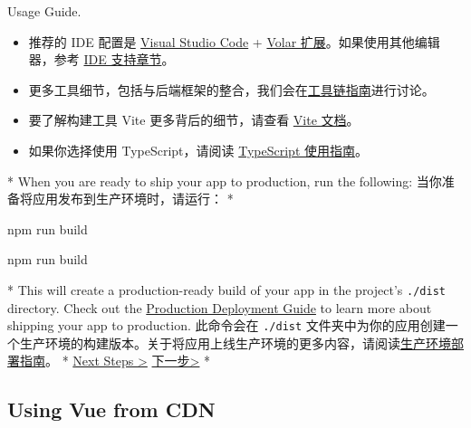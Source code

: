 \begin{paracol}{2}
\begin{itemize}
{      Usage Guide}.
    \end{itemize}
\switchcolumn
\begin{itemize}
    \item
      推荐的 IDE 配置是 \href{https://code.visualstudio.com/}{Visual Studio
      Code} +
      \href{https://marketplace.visualstudio.com/items?itemName=Vue.volar}{Volar
      扩展}。如果使用其他编辑器，参考
      \href{https://cn.vuejs.org/guide/scaling-up/tooling.html\#ide-support}{IDE
      支持章节}。
    \item
      更多工具细节，包括与后端框架的整合，我们会在\href{https://cn.vuejs.org/guide/scaling-up/tooling.html}{工具链指南}进行讨论。
    \item
      要了解构建工具 Vite 更多背后的细节，请查看
      \href{https://cn.vitejs.dev/}{Vite 文档}。
    \item
      如果你选择使用 TypeScript，请阅读
      \href{https://cn.vuejs.org/guide/typescript/overview.html}{TypeScript
      使用指南}。
    \end{itemize}
\switchcolumn[0]*%
When you are ready to ship your app to production, run the following:
\switchcolumn
当你准备将应用发布到生产环境时，请运行：
\switchcolumn[0]*%
\begin{codeShellMul}
npm run build
\end{codeShellMul}
\switchcolumn
\begin{codeShellMul}
npm run build
\end{codeShellMul}
\switchcolumn[0]*%
This will create a production-ready build of your app in the project's
\texttt{./dist} directory. Check out the
\href{https://vuejs.org/guide/best-practices/production-deployment.html}{Production
Deployment Guide} to learn more about shipping your app to production.
\switchcolumn
此命令会在 \texttt{./dist}
文件夹中为你的应用创建一个生产环境的构建版本。关于将应用上线生产环境的更多内容，请阅读\href{https://cn.vuejs.org/guide/best-practices/production-deployment.html}{生产环境部署指南}。
\switchcolumn[0]*%
\href{https://vuejs.org/guide/quick-start.html\#next-steps}{Next Steps
\textgreater{}}
\switchcolumn
\href{https://cn.vuejs.org/guide/quick-start.html\#next-steps}{下一步\textgreater{}}
\switchcolumn[0]*%
\subsection{Using Vue from CDN}
\switchcolumn

\end{paracol}
